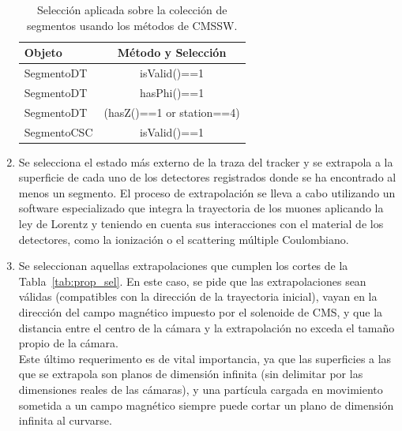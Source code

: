 \begin{enumerate}
\begin{table}[htbp]
  \begin{center}
    {\normalsize
      \begin{tabular} {lc}
        \hline
        \hline
        Objeto & M\'etodo y Selecci\'on                    \\
        \hline
        SegmentoDT            & isValid()==1               \\
        SegmentoDT            & hasPhi()==1                \\
        SegmentoDT            & (hasZ()==1 or station==4)  \\
        SegmentoCSC           & isValid()==1               \\
        \hline
      \end{tabular}
    }
    \caption{Selecci\'on aplicada sobre la colecci\'on de segmentos usando los m\'etodos de CMSSW.}
    \label{tab:segment_sel}
  \end{center}
\end{table}


\item Se selecciona el estado m\'as externo de la traza del tracker y se extrapola a la superficie de cada uno de los detectores registrados donde se ha encontrado al menos un segmento. El proceso de extrapolaci\'on se lleva a cabo utilizando un software especializado que integra la trayectoria de los muones aplicando la ley de Lorentz y teniendo en cuenta sus interacciones con el material de los detectores, como la ionizaci\'on o el scattering m\'ultiple Coulombiano.
\item Se seleccionan aquellas extrapolaciones que cumplen los cortes de la Tabla~\ref{tab:prop_sel}. En este caso, se pide que las extrapolaciones sean v\'alidas (compatibles con la direcci\'on de la trayectoria inicial), vayan en la direcci\'on del campo magn\'etico impuesto por el solenoide de CMS, y que la distancia entre el centro de la c\'amara y la extrapolaci\'on no exceda el tama\~no propio de la c\'amara. \\
Este \'ultimo requerimento es de vital importancia, ya que las superficies a las que se extrapola son planos de dimensi\'on infinita (sin delimitar por las dimensiones reales de las c\'amaras), y una part\'icula cargada en movimiento sometida a un campo magn\'etico siempre puede cortar un plano de dimensi\'on infinita al curvarse.


\end{enumerate}
